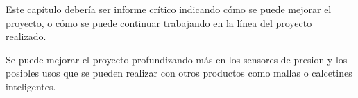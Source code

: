 


Este capítulo debería ser informe crítico indicando cómo se puede mejorar el proyecto, o cómo se puede continuar trabajando en la línea del proyecto realizado.

Se puede mejorar el proyecto profundizando más en los sensores de presion y los posibles usos que se pueden realizar con  otros productos como mallas o calcetines inteligentes.